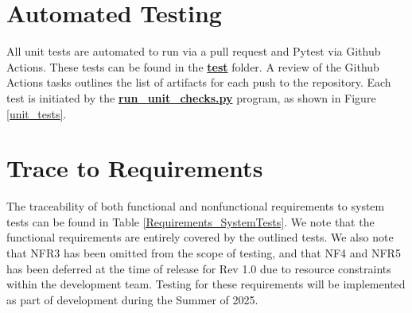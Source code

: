 \documentclass[12pt, titlepage]{article}
\begin{document}
\section{Automated Testing}
All unit tests are automated to run via a pull request and Pytest via Github Actions. These tests can be found in the \href{https://github.com/KiranSingh15/CAS-741-Image-Correspondences/tree/main/test}{\textbf{test}} folder. A review of the Github Actions tasks outlines the list of artifacts for each push to the repository. Each test is initiated by the \href{https://github.com/KiranSingh15/CAS-741-Image-Correspondences/blob/main/test/run_unit_checks.py}{\textbf{run\_unit\_checks.py}} program, as shown in Figure \ref{unit_tests}. 

		
\section{Trace to Requirements}
The traceability of both functional and nonfunctional requirements to system tests can be found in Table \ref{Requirements_SystemTests}. We note that the functional requirements are entirely covered by the outlined tests. We also note that NFR3 has been omitted from the scope of testing, and that NF4 and NFR5 has been deferred at the time of release for Rev 1.0 due to resource constraints within the development team. Testing for these requirements will be implemented as part of development during the Summer of 2025.
\end{document}
